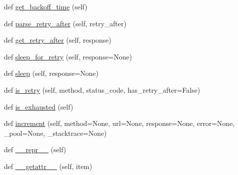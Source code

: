 \begin{DoxyCompactItemize}
\item 
def \hyperlink{classpip_1_1__vendor_1_1urllib3_1_1util_1_1retry_1_1Retry_a36a85c93337e4cab2e6e47137d955301}{get\+\_\+backoff\+\_\+time} (self)
\item 
def \hyperlink{classpip_1_1__vendor_1_1urllib3_1_1util_1_1retry_1_1Retry_ade99263d6dbba90aa6fa4d16fc71af87}{parse\+\_\+retry\+\_\+after} (self, retry\+\_\+after)
\item 
def \hyperlink{classpip_1_1__vendor_1_1urllib3_1_1util_1_1retry_1_1Retry_a2f35e96e98a7162d347056695959dc8c}{get\+\_\+retry\+\_\+after} (self, response)
\item 
def \hyperlink{classpip_1_1__vendor_1_1urllib3_1_1util_1_1retry_1_1Retry_a82a91a77b0784a51e3236f847dd9b3a2}{sleep\+\_\+for\+\_\+retry} (self, response=None)
\item 
def \hyperlink{classpip_1_1__vendor_1_1urllib3_1_1util_1_1retry_1_1Retry_a99bb4fc2a54b5769ff39c48d6767f974}{sleep} (self, response=None)
\item 
def \hyperlink{classpip_1_1__vendor_1_1urllib3_1_1util_1_1retry_1_1Retry_adcf6a54946ef419bffbcd68356b5093a}{is\+\_\+retry} (self, method, status\+\_\+code, has\+\_\+retry\+\_\+after=False)
\item 
def \hyperlink{classpip_1_1__vendor_1_1urllib3_1_1util_1_1retry_1_1Retry_a8b97633f741ac38f97c6ab38131dbb5d}{is\+\_\+exhausted} (self)
\item 
def \hyperlink{classpip_1_1__vendor_1_1urllib3_1_1util_1_1retry_1_1Retry_a9ea1500ac63c8193d039755f462a1429}{increment} (self, method=None, url=None, response=None, error=None, \+\_\+pool=None, \+\_\+stacktrace=None)
\item 
def \hyperlink{classpip_1_1__vendor_1_1urllib3_1_1util_1_1retry_1_1Retry_aad3d51f0fa479d2471ffc66521dd2826}{\+\_\+\+\_\+repr\+\_\+\+\_\+} (self)
\item 
def \hyperlink{classpip_1_1__vendor_1_1urllib3_1_1util_1_1retry_1_1Retry_a028c04e4b9d19918dd5a7d9a5686a647}{\+\_\+\+\_\+getattr\+\_\+\+\_\+} (self, item)
\end{DoxyCompactItemize}
